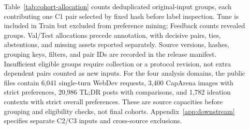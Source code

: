 Table~\ref{tab:cohort-allocation} counts deduplicated original-input groups, each contributing one C1 pair selected by fixed hash before label inspection.
Tune is included in Train but excluded from preference mining; Feedback counts revealed groups.
Val/Test allocations precede annotation, with decisive pairs, ties, abstentions, and missing assets reported separately.
Source versions, hashes, grouping keys, filters, and pair IDs are recorded in the release manifest.
Insufficient eligible groups require collection or a protocol revision, not extra dependent pairs counted as new inputs.
For the four analysis domains, the public files contain 6,041 single-turn WebDev requests, 3,400 CapArena images with strict preferences, 20,986 TL;DR posts with comparisons, and 1,782 ideation contexts with strict overall preferences.
These are source capacities before grouping and eligibility checks, not final cohorts.
Appendix~\ref{app:downstream} specifies separate C2/C3 inputs and cross-source exclusions.

